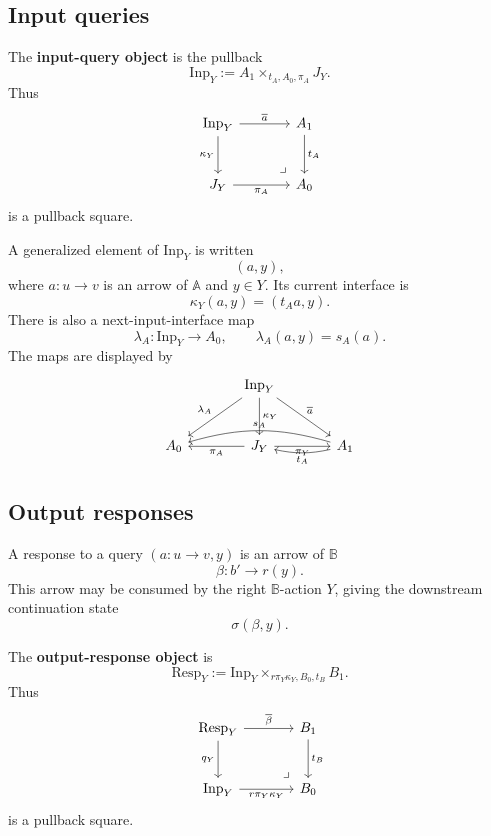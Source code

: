 \subsection{Input queries}
\label{subsec:poly-relative-input-queries}

\begin{definition}
\label{def:poly-relative-input-query-object}
The \textbf{input-query object} is the pullback
\[
\mathrm{Inp}_Y:=A_1\times_{t_A,A_0,\pi_A}J_Y.
\]
Thus
\[
\begin{tikzcd}[column sep=large,row sep=large]
\mathrm{Inp}_Y
  \arrow[r,"\overline a"]
  \arrow[d,"\kappa_Y"']
&
A_1
  \arrow[d,"t_A"]
\\
J_Y
  \arrow[r,"\pi_A"']
&
A_0
\arrow[ul,phantom,very near start,"\lrcorner"]
\end{tikzcd}
\]
is a pullback square.
\end{definition}

A generalized element of \(\mathrm{Inp}_Y\) is written
\[
(a,y),
\]
where \(a:u\to v\) is an arrow of \(\mathbb A\) and \(y\in Y\).  Its current
interface is
\[
\kappa_Y(a,y)=(t_Aa,y).
\]
There is also a next-input-interface map
\[
\lambda_A:\mathrm{Inp}_Y\to A_0,
\qquad
\lambda_A(a,y)=s_A(a).
\]
The maps are displayed by
\[
\begin{tikzcd}[column sep=large,row sep=large]
&
\mathrm{Inp}_Y
  \arrow[dl,"\lambda_A"']
  \arrow[d,"\kappa_Y"]
  \arrow[dr,"\overline a"]
&
\\
A_0
&
J_Y
  \arrow[l,"\pi_A"]
  \arrow[r,"\pi_Y"']
&
A_1
  \arrow[l,bend left=12,"t_A"]
  \arrow[ll,bend right=16,"s_A"']
\end{tikzcd}
\]

\subsection{Output responses}
\label{subsec:poly-relative-output-responses}

A response to a query \((a:u\to v,y)\) is an arrow of \(\mathbb B\)
\[
\beta:b'\to r(y).
\]
This arrow may be consumed by the right \(\mathbb B\)-action \(Y\), giving the
downstream continuation state
\[
\sigma(\beta,y).
\]

\begin{definition}
\label{def:poly-relative-output-response-object}
The \textbf{output-response object} is
\[
\mathrm{Resp}_Y
:=
\mathrm{Inp}_Y\times_{r\pi_Y\kappa_Y,B_0,t_B}B_1.
\]
Thus
\[
\begin{tikzcd}[column sep=large,row sep=large]
\mathrm{Resp}_Y
  \arrow[r,"\overline\beta"]
  \arrow[d,"q_Y"']
&
B_1
  \arrow[d,"t_B"]
\\
\mathrm{Inp}_Y
  \arrow[r,"r\pi_Y\kappa_Y"']
&
B_0
\arrow[ul,phantom,very near start,"\lrcorner"]
\end{tikzcd}
\]
is a pullback square.
\end{definition}

